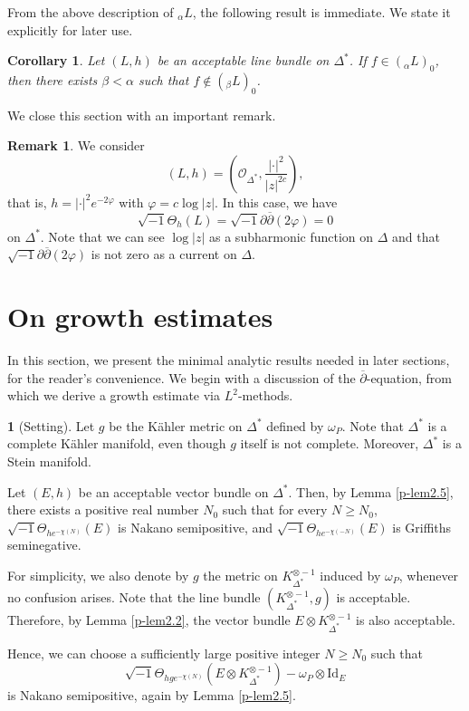 \documentclass[12pt,twoside]{amsart}
\newtheorem{cor}[thm]{Corollary}
\theoremstyle{definition}
\newtheorem{rem}[thm]{Remark}
\newtheorem{say}[thm]{}
\begin{document}
From the above description 
of ${}_\alpha L$, the following result is immediate.
We state it explicitly for later use.

\begin{cor}\label{p-cor4.5}
Let $(L, h)$ be an acceptable line bundle on $\Delta^*$.
If $f \in ({}_\alpha L)_0$, then there exists $\beta < \alpha$ such that
$f \notin ({}_\beta L)_0$.
\end{cor}

We close this section with an important remark. 

\begin{rem}\label{p-rem4.6}
We consider 
\[
(L, h)=\left(\mathcal O_{\Delta^*}, \frac{|\cdot |^2}{|z|^{2c}}\right), 
\] 
that is, $h=|\cdot |^2e^{-2\varphi}$ with 
$\varphi=c\log |z|$. 
In this case, we have 
\[
\sqrt{-1}\Theta_h(L)=\sqrt{-1}\partial 
\overline \partial (2\varphi)=0
\] 
on $\Delta^*$. Note that we can see $\log |z|$ as a 
subharmonic function on $\Delta$ and 
that $\sqrt{-1} \partial \overline \partial (2\varphi)$ is not zero 
as a current on $\Delta$. 
\end{rem}

\section{On growth estimates}\label{p-sec5}

In this section, we present the minimal 
analytic results needed in later sections, 
for the reader's convenience.  
We begin with a discussion of the $\overline{\partial}$-equation, 
from which we derive a growth estimate via $L^2$-methods.

\begin{say}[Setting]\label{p-say5.1}
Let $g$ be the K\"ahler metric on $\Delta^*$ defined 
by $\omega_P$.  
Note that $\Delta^*$ is a complete K\"ahler manifold, 
even though $g$ itself is not complete.  
Moreover, $\Delta^*$ is a Stein manifold.

Let $(E, h)$ be an acceptable vector bundle on $\Delta^*$.  
Then, by Lemma \ref{p-lem2.5}, there 
exists a positive real number 
$N_0$ such that for every $N \geq N_0$, 
$\sqrt{-1}\Theta_{he^{-\chi(N)}}(E)$ is Nakano semipositive, and 
$\sqrt{-1}\Theta_{he^{-\chi(-N)}}(E)$ is Griffiths seminegative. 

For simplicity, we also denote by $g$ 
the metric on $K_{\Delta^*}^{\otimes -1}$ 
induced by $\omega_P$, whenever no confusion arises.  
Note that the line bundle $(K_{\Delta^*}^{\otimes -1}, g)$ is acceptable.  
Therefore, by Lemma \ref{p-lem2.2}, 
the vector bundle $E \otimes K_{\Delta^*}^{\otimes -1}$ is also acceptable.

Hence, we can choose a 
sufficiently large positive integer $N \geq N_0$ such that
\[
\sqrt{-1} \Theta_{hge^{-\chi (N)}}(E \otimes K_{\Delta^*}^{\otimes -1}) 
- \omega_P \otimes \mathrm{Id}_E
\]
is Nakano semipositive, again by Lemma \ref{p-lem2.5}.
\end{say}
\end{document}
